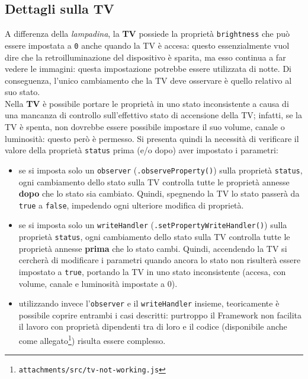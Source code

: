 \documentclass[12pt,a4paper,openright,oneside]{report}
\begin{document}
\subsection{Dettagli sulla TV}
A differenza della \textit{lampadina}, la \textbf{TV} possiede la proprietà \texttt{brightness} che può essere impostata a \texttt{0} anche quando la TV è accesa: questo essenzialmente vuol dire che la retroilluminazione del dispositivo è sparita, ma esso continua a far vedere le immagini: questa impostazione potrebbe essere utilizzata di notte. Di conseguenza, l'unico cambiamento che la TV deve osservare è quello relativo al suo stato.\\

Nella \textbf{TV} è possibile portare le proprietà in uno stato inconsistente a causa di una mancanza di controllo sull'effettivo stato di accensione della TV; infatti, se la TV è spenta, non dovrebbe essere possibile impostare il suo volume, canale o luminosità: questo però è permesso. Si presenta quindi la necessità di verificare il valore della proprietà \texttt{status} prima (e/o dopo) aver impostato i parametri:

\begin{itemize}
	\item se si imposta solo un \texttt{observer} (\texttt{.observeProperty()}) sulla proprietà \texttt{status}, ogni cambiamento dello stato sulla TV controlla tutte le proprietà annesse \textbf{dopo} che lo stato sia cambiato. Quindi, spegnendo la TV lo stato passerà da \texttt{true} a \texttt{false}, impedendo ogni ulteriore modifica di proprietà.
	
	\item se si imposta solo un \texttt{writeHandler} (\texttt{.setPropertyWriteHandler()}) sulla proprietà \texttt{status}, ogni cambiamento dello stato sulla TV controlla tutte le proprietà annesse \textbf{prima} che lo stato cambi. Quindi, accendendo la TV si cercherà di modificare i parametri quando ancora lo stato non risulterà essere impostato a \texttt{true}, portando la TV in uno stato inconsistente (accesa, con volume, canale e luminosità impostate a 0).
	
	\item utilizzando invece l'\texttt{observer} e il \texttt{writeHandler} insieme, teoricamente è possibile coprire entrambi i casi descritti: purtroppo il Framework non facilita il lavoro con proprietà dipendenti tra di loro e il codice (disponibile anche come allegato\footnote{\texttt{attachments/src/tv-not-working.js}}) risulta essere complesso.
\end{itemize}
\end{document}
